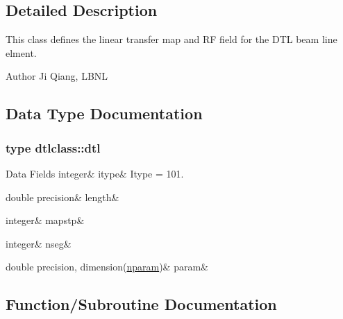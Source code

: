 \subsection{Detailed Description}
This class defines the linear transfer map and RF field for the D\+TL beam line elment. 

\begin{DoxyAuthor}{Author}
Ji Qiang, L\+B\+NL 
\end{DoxyAuthor}


\subsection{Data Type Documentation}
\label{structdtlclass_1_1dtl}
\subsubsection{type dtlclass\+::dtl}
\begin{DoxyFields}{Data Fields}
\mbox{\label{namespacedtlclass_a75f1d8c2908cb2ac40cd24dc45a122ff}} 
integer&
itype&
Itype = 101. \\
\hline

\mbox{\label{namespacedtlclass_ac3b7a490164af376dab82d59957bcdd3}} 
double precision&
length&
\\
\hline

\mbox{\label{namespacedtlclass_ad89c7805074fee80c05af3ae3861cb87}} 
integer&
mapstp&
\\
\hline

\mbox{\label{namespacedtlclass_ab0c5195ab0993ee3107484257b94cfe5}} 
integer&
nseg&
\\
\hline

\mbox{\label{namespacedtlclass_a95bc1c81e12444e39d8ea61b6e67ae34}} 
double precision, dimension(\mbox{\hyperlink{namespacedtlclass_adf04761c96168c3dc492c89c72194cea}{nparam}})&
param&
\\
\hline

\end{DoxyFields}


\subsection{Function/\+Subroutine Documentation}
\mbox{\label{namespacedtlclass_a5f65e89a18b2765e966ea8c1db85aa0c}} 
